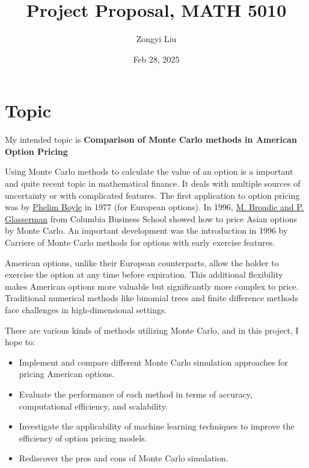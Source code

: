 \documentclass[margin=1in]{article}
\title{Project Proposal, MATH 5010}
\author{Zongyi Liu}
\date{Feb 28, 2025}
\begin{document}
		\maketitle
		
		\section*{Topic }
		My intended topic is \textbf{Comparison of Monte Carlo methods in American Option Pricing}
		
		Using Monte Carlo methods to calculate the value of an option is a important and quite recent topic in mathematical finance. It deals with multiple sources of uncertainty or with complicated features. The first application to option pricing was by  \href{https://www.sciencedirect.com/science/article/abs/pii/0304405X77900058}{Phelim Boyle} in 1977 (for European options). In 1996, \href{https://www.columbia.edu/~mnb2/broadie/Assets/bg_ms_1996.pdf}{M. Broadie and P. Glasserman} from Columbia Business School showed how to price Asian options by Monte Carlo. An important development was the introduction in 1996 by Carriere of Monte Carlo methods for options with early exercise features.
		
		American options, unlike their European counterparts, allow the holder to exercise the option at any time before expiration. This additional flexibility makes American options more valuable but significantly more complex to price. Traditional numerical methods like binomial trees and finite difference methods face challenges in high-dimensional settings. 
		
		There are various kinds of methods utilizing Monte Carlo, and in this project, I hope to:
		
		\begin{itemize}
			\item Implement and compare different Monte Carlo simulation approaches for pricing American options.
			
			\item Evaluate the performance of each method in terms of accuracy, computational efficiency, and scalability.
			
			\item Investigate the applicability of machine learning techniques to improve the efficiency of option pricing models.
			
			\item Rediscover the pros and cons of Monte Carlo simulation.
		\end{itemize}
\end{document}
